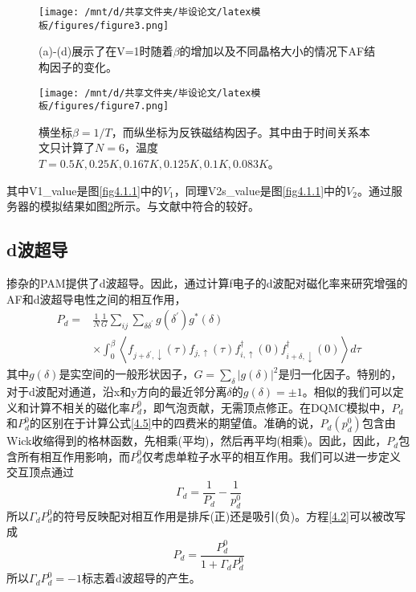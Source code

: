 \begin{figure}[htbp]
    \centering
    \texttt{[image: /mnt/d/共享文件夹/毕设论文/latex模板/figures/figure3.png]}
    \caption{(a)-(d)展示了在V=1时随着$\beta$的增加以及不同晶格大小的情况下AF结构因子的变化\cite{12}。}
    \label{fig5}
\end{figure}


\begin{figure}[h]
    \centering
    \texttt{[image: /mnt/d/共享文件夹/毕设论文/latex模板/figures/figure7.png]}
    \caption{横坐标$\beta=1/T$，而纵坐标为反铁磁结构因子。其中由于时间关系本文只计算了$N=6$，温度$T=0.5K,0.25K,0.167K,0.125K,0.1K,0.083 K$。}
    \label{fig7}
\end{figure}

其中V1\_value是图\ref{fig4.1.1}中的$V_1$，同理V2s\_value是图\ref{fig4.1.1}中的$V_2$。通过服务器的模拟结果如图\ref{fig7}所示。与文献中符合的较好。


\subsection{d波超导}
掺杂的PAM提供了d波超导。因此，通过计算f电子的d波配对磁化率来研究增强的AF和d波超导电性之间的相互作用，
\begin{equation}
    \begin{aligned}
    P_{d}=& \frac{1}{N} \frac{1}{G} \sum_{i j} \sum_{\delta \delta^{\prime}} g\left(\delta^{\prime}\right) g^{*}(\delta) \\
    & \times \int_{0}^{\beta}\left\langle f_{j+\delta^{\prime}, \downarrow}(\tau) f_{j, \uparrow}(\tau) f_{i, \uparrow}^{\dagger}(0) f_{i+\delta, \downarrow}^{\dagger}(0)\right\rangle d \tau
    \label{4.5}
    \end{aligned}
\end{equation}
其中$g(\delta)$是实空间的一般形状因子，$G=\sum_\delta |g(\delta)|^2$是归一化因子。特别的，对于d波配对通道，沿x和y方向的最近邻分离$\delta$的$g(\delta)=\pm 1$。相似的我们可以定义和计算不相关的磁化率$P^0_d$，即气泡贡献，无需顶点修正。在DQMC模拟中，$P_d$和$P^0_d$的区别在于计算公式\ref{4.5}中的四费米的期望值。准确的说，$P_d(p^0_d)$包含由Wick收缩得到的格林函数，先相乘(平均)，然后再平均(相乘)。因此，因此，$P_d$包含所有相互作用影响，而$P^0_d$仅考虑单粒子水平的相互作用。我们可以进一步定义交互顶点通过
\begin{equation}
    \Gamma_d=\frac{1}{P_d}-\frac{1}{p^0_d}
    \label{4.2}
\end{equation}
所以$\Gamma_d P^0_d$的符号反映配对相互作用是排斥(正)还是吸引(负)。方程\ref{4.2}可以被改写成
\begin{equation}
    P_d=\frac{P^0_d}{1+\Gamma_d P^0_d}
\end{equation}
所以$\Gamma_d P^0_d=-1$标志着d波超导的产生。

